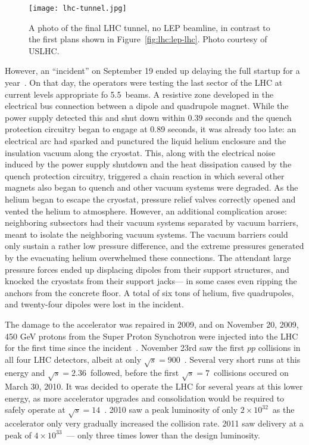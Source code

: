 
\begin{figure}
\centering
\texttt{[image: lhc-tunnel.jpg]}
\label{fig:lhc:lhc-tunnel}
\caption{A photo of the final LHC tunnel, no LEP beamline, in contrast to the first plans shown in Figure~\ref{fig:lhc:lep-lhc}. Photo courtesy of USLHC.}
\end{figure}


However, an ``incident'' on September 19 ended up delaying the full startup for a year~\cite{Incident}. On that day, the operators were testing the last sector of the LHC at current levels appropriate fo 5.5~\TeV beams. A resistive zone developed in the electrical bus connection between a dipole and quadrupole magnet. While the power supply detected this and shut down within 0.39 seconds and the quench protection circuitry began to engage at 0.89 seconds, it was already too late: an electrical arc had sparked and punctured the liquid helium enclosure and the insulation vacuum along the cryostat. This, along with the electrical noise induced by the power supply shutdown and the heat dissipation caused by the quench protection circuitry, triggered a chain reaction in which several other magnets also began to quench and other vacuum systems were degraded. As the helium began to escape the cryostat, pressure relief valves correctly opened and vented the helium to atmosphere. However, an additional complication arose: neighboring subsectors had their vacuum systems separated by vacuum barriers, meant to isolate the neighboring vacuum systems. The vacuum barriers could only sustain a rather low pressure difference, and the extreme pressures generated by the evacuating helium overwhelmed these connections. The attendant large pressure forces ended up displacing dipoles from their support structures, and knocked the cryostats from their support jacks--- in some cases even ripping the anchors from the concrete floor. A total of six tons of helium, five quadrupoles, and twenty-four dipoles were lost in the incident. 

The damage to the accelerator was repaired in 2009, and on November 20, 2009, 450 GeV protons from the Super Proton Synchotron were injected into the LHC for the first time since the incident~\cite{LHCWeb}. November 23rd saw the first $pp$ collisions in all four LHC detectors, albeit at only $\sqrt{s} = 900$~\GeV. Several very short runs at this energy and $\sqrt{s} = 2.36$~\TeV followed, before the first $\sqrt{s} = 7$~\TeV collisions occured on March 30, 2010. It was decided to operate the LHC for several years at this lower energy, as more accelerator upgrades and consolidation would be required to safely operate at $\sqrt{s} = 14$~\TeV. 2010 saw a peak luminosity of only $2\times10^{32}$~\lumirate as the accelerator only very gradually increased the collision rate. 2011 saw delivery at a peak of $4 \times 10^{33}$~\lumirate--- only three times lower than the design luminosity.

